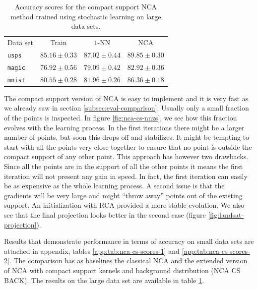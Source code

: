 \begin{table}
            	\centering
            	\begin{tabular}{lccc}
            	\toprule
            	Data set & Train & $1$-NN & NCA \\
            	\cmidrule(r){2-2}\cmidrule(r){3-4}
\texttt{usps}&$85.16 \pm 0.33$&$87.02 \pm 0.44$&$89.85 \pm 0.30$\\ 
\texttt{magic}&$76.92 \pm 0.56$&$79.09 \pm 0.42$&$82.92 \pm 0.36$\\ 
\texttt{mnist}&$80.55 \pm 0.28$&$81.96 \pm 0.26$&$86.36 \pm 0.18$\\ 
  \bottomrule
  \end{tabular}
  \caption[Accuracy scores for compact support NCA trained using stochastic learning on large data sets]{Accuracy scores for the compact support NCA method trained using stochastic learning on large data sets.}
  \label{tab:nca-cs-scores}
\end{table}

The compact support version of NCA is easy to implement and it is very fast as we already saw in section \ref{subsec:eval-comparison}. Usually only a small fraction of the points is inspected. In figure \ref{fig:nca-cs-nnzs}, we see how this fraction evolves with the learning process. In the first iterations there might be a larger number of points, but soon this drops off and stabilizes. It might be tempting to start with all the points very close together to ensure that no point is outside the compact support of any other point. This approach has however two drawbacks. Since all the points are in the support of all the other points it means the first iteration will not present any gain in speed. In fact, the first iteration can easily be as expensive as the whole learning process. A second issue is that the gradients will be very large and might ``throw away'' points out of the existing support. An initialization with RCA provided a more stable evolution. We also see that the final projection looks better in the second case (figure \ref{fig:landsat-projection}).

Results that demonstrate performance in terms of accuracy on small data sets are attached in appendix, tables \ref{app:tab:nca-cs-scores-1} and \ref{app:tab:nca-cs-scores-2}. The comparison has as baselines the classical NCA and the extended version of NCA with compact support kernels and background distribution (NCA CS BACK). The results on the large data set are available in table \ref{tab:nca-cs-scores}. 

